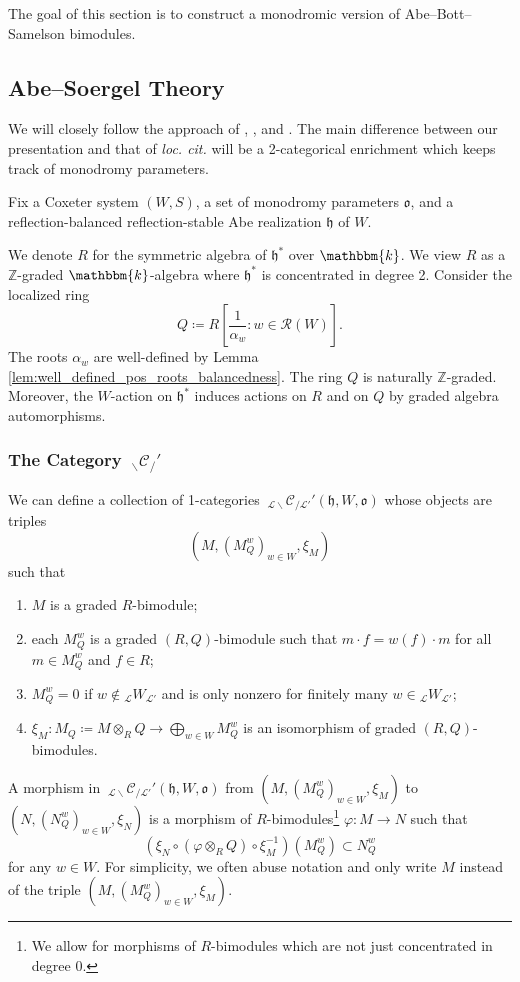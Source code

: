 \documentclass{amsart}
\newcommand{\Z}{\mathbb{Z}}
\renewcommand{\k}{\mathbbm{k}}
\newcommand{\scrL}{\mathcal{L}}
\newcommand{\scrR}{\mathcal{R}}
\newcommand{\fr}[1]{\mathfrak{#1}}
\newcommand{\Cmon}[2]{\:_{#1 \backslash} \mathcal{C}_{/ #2} }
\newcommand{\W}[2]{{}_{#1}W_{#2}}
\theoremstyle{definition}
\numberwithin{equation}{subsection}
\begin{document}
The goal of this section is to construct a monodromic version of Abe--Bott--Samelson bimodules.

\subsection{Abe--Soergel Theory}

We will closely follow the approach of \cite{Abe19}, \cite{Abe21}, and \cite{RV}. The main difference between our presentation and that of \emph{loc. cit.} will be a 2-categorical enrichment which keeps track of monodromy parameters.

Fix a Coxeter system $(W,S)$, a set of monodromy parameters $\fr{o}$, and a reflection-balanced reflection-stable Abe realization $\fr{h}$ of $W$.

We denote $R$ for the symmetric algebra of $\fr{h}^*$ over $\k$.
We view $R$ as a $\Z$-graded $\k$-algebra where $\fr{h}^*$ is concentrated in degree 2.
Consider the localized ring
\[Q \coloneq R \left[ \frac{1}{\alpha_w} \colon w \in \scrR (W) \right].\]
The roots $\alpha_w$ are well-defined by Lemma \ref{lem:well_defined_pos_roots_balancedness}.
The ring $Q$ is naturally $\Z$-graded. Moreover, the $W$-action on $\fr{h}^*$ induces actions on $R$ and on $Q$ by graded algebra automorphisms.

\subsubsection{The Category \texorpdfstring{$\Cmon{}{}'$}{C'}}

We can define a collection of 1-categories $\Cmon{\scrL}{\scrL'}' (\fr{h}, W, \fr{o})$ whose objects are triples
\[(M, (M_Q^w)_{w \in W}, \xi_M)\]
such that
\begin{enumerate}
    \item $M$ is a graded $R$-bimodule;
    \item each $M_Q^w$ is a graded $(R,Q)$-bimodule such that $m \cdot f = w (f) \cdot m$ for all $m \in M_Q^w$ and $f \in R$;
    \item $M_Q^w = 0$ if $w \notin \W{\scrL}{\scrL'}$ and is only nonzero for finitely many $w \in \W{\scrL}{\scrL'}$;
    \item $\xi_M : M_Q \coloneq M \otimes_R Q \to \bigoplus_{w \in W} M_Q^w$ is an isomorphism of graded $(R, Q)$-bimodules.
\end{enumerate}
A morphism in $\Cmon{\scrL}{\scrL'}' (\fr{h}, W, \fr{o})$ from $(M, (M_Q^w)_{w \in W}, \xi_M)$ to $(N, (N_Q^w)_{w \in W}, \xi_N)$ is a morphism of $R$-bimodules\footnote{We allow for morphisms of $R$-bimodules which are not just concentrated in degree 0.} $\varphi : M \to N$ such that
\[(\xi_N \circ (\varphi \otimes_R Q) \circ \xi_M^{-1}) (M_Q^w) \subset N_Q^w\]
for any $w \in W$. For simplicity, we often abuse notation and only write $M$ instead of the triple $(M, (M_Q^w)_{w \in W}, \xi_M)$. 
\end{document}
